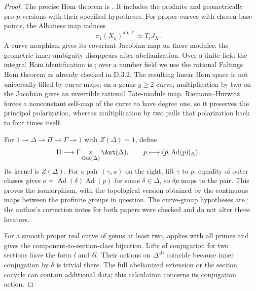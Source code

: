 \begin{proof}
The precise Hom theorem is \cite[Theorem A, PDF p.3, equivalently Theorem 16.5 and its following remark]{AuditMochizuki1999}. It includes the profinite and geometrically pro-$p$ versions with their specified hypotheses. For proper curves with chosen base points, the Albanese map induces
\[
 \pi_1(X_{\bar k})^{\mathrm{ab},\ell}\simeq T_\ell J_X.
\]
A curve morphism gives its covariant Jacobian map on these modules; the geometric inner ambiguity disappears after abelianization. Over a finite field the integral Hom identification is \cite[Main Theorem, p.134]{AuditTate1966}; over a number field we use the rational Faltings Hom theorem as already checked in D.3.2. The resulting linear Hom space is not universally filled by curve maps: on a genus-$g\geq2$ curve, multiplication by two on the Jacobian gives an invertible rational Tate-module map. Riemann--Hurwitz forces a nonconstant self-map of the curve to have degree one, so it preserves the principal polarization, whereas multiplication by two pulls that polarization back to four times itself.

For $1\to\Delta\to\Pi\to\Gamma\to1$ with $Z(\Delta)=1$, define
\[
 \Pi\longrightarrow
 \Gamma\mathop{\times}_{\operatorname{Out}(\Delta)}\Aut(\Delta),
 \qquad p\longmapsto(\bar p,\operatorname{Ad}(p)|_\Delta).
\]
Its kernel is $Z(\Delta)$. For a pair $(\gamma,a)$ on the right, lift $\gamma$ to $p$; equality of outer classes gives $a=\operatorname{Ad}(\delta)\operatorname{Ad}(p)$ for some $\delta\in\Delta$, so $\delta p$ maps to the pair. This proves the isomorphism, with the topological version obtained by the continuous maps between the profinite groups in question. The curve-group hypotheses are \cite[Lemma 1.3.1 and Corollary 1.3.2]{AuditMochizuki2004}; the author's correction notes for both papers were checked and do not alter these locators.

For a smooth proper real curve of genus at least two, \cite[Theorem 1.3 and Example 5.8]{AuditPal2011} applies with all primes and gives the component-to-section-class bijection. Lifts of conjugation for two sections have the form $l$ and $\delta l$. Their actions on $\Delta^{\mathrm{ab}}$ coincide because inner conjugation by $\delta$ is trivial there. The full abelianized extension or the section cocycle can contain additional data; this calculation concerns its conjugation action.


\end{proof}
